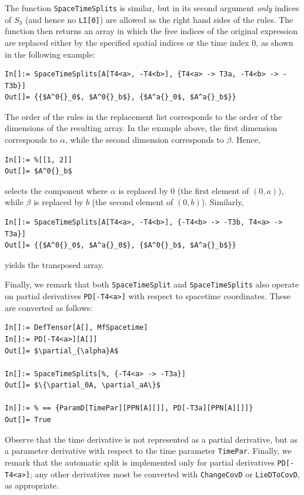 \documentclass[notitlepage,a4paper,aps,prd,onecolumn,superscriptaddress,nofootinbib,groupedaddress,longbibliography]{revtex4-1}
\begin{document}
The function \lstinline/SpaceTimeSplits/ is similar, but in its second argument \emph{only} indices of \(S_3\) (and hence no \lstinline/LI[0]/) are allowed as the right hand sides of the rules. The function then returns an array in which the free indices of the original expression are replaced either by the specified spatial indices or the time index 0, as shown in the following example:
\begin{lstlisting}
In[]:= SpaceTimeSplits[A[T4<a>, -T4<b>], {T4<a> -> T3a, -T4<b> -> -T3b}]
Out[]= {{$A^0{}_0$, $A^0{}_b$}, {$A^a{}_0$, $A^a{}_b$}}
\end{lstlisting}
The order of the rules in the replacement list corresponds to the order of the dimensions of the resulting array. In the example above, the first dimension corresponds to \(\alpha\), while the second dimension corresponds to \(\beta\). Hence,
\begin{lstlisting}
In[]:= %[[1, 2]]
Out[]= $A^0{}_b$
\end{lstlisting}
selects the component where \(\alpha\) is replaced by \(0\) (the first element of \((0, a)\)), while \(\beta\) is replaced by \(b\) (the second element of \((0, b)\)). Similarly,
\begin{lstlisting}
In[]:= SpaceTimeSplits[A[T4<a>, -T4<b>], {-T4<b> -> -T3b, T4<a> -> T3a}]
Out[]= {{$A^0{}_0$, $A^a{}_0$}, {$A^0{}_b$, $A^a{}_b$}}
\end{lstlisting}
yields the transposed array.

Finally, we remark that both \lstinline/SpaceTimeSplit/ and \lstinline/SpaceTimeSplits/ also operate on partial derivatives \lstinline/PD[-T4<a>]/ with respect to spacetime coordinates. These are converted as follows:
\begin{lstlisting}
In[]:= DefTensor[A[], MfSpacetime]
In[]:= PD[-T4<a>][A[]]
Out[]= $\partial_{\alpha}A$

In[]:= SpaceTimeSplits[%, {-T4<a> -> -T3a}]
Out[]= $\{\partial_0A, \partial_aA\}$

In[]:= % == {ParamD[TimePar][PPN[A][]], PD[-T3a][PPN[A][]]}
Out[]= True
\end{lstlisting}
Observe that the time derivative is not represented as a partial derivative, but as a parameter derivative with respect to the time parameter \lstinline/TimePar/. Finally, we remark that the automatic split is implemented only for partial derivatives \lstinline/PD[-T4<a>]/; any other derivatives most be converted with \lstinline/ChangeCovD/ or \lstinline/LieDToCovD/, as appropriate.
\end{document}
